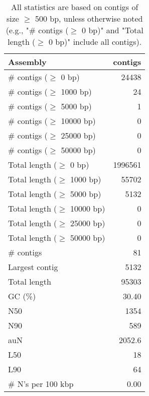 \documentclass[12pt,a4paper]{article}
\begin{document}
\begin{table}[ht]
\begin{center}
\caption{All statistics are based on contigs of size $\geq$ 500 bp, unless otherwise noted (e.g., "\# contigs ($\geq$ 0 bp)" and "Total length ($\geq$ 0 bp)" include all contigs).}
\begin{tabular}{|l*{1}{|r}|}
\hline
Assembly & contigs \\ \hline
\# contigs ($\geq$ 0 bp) & 24438 \\ \hline
\# contigs ($\geq$ 1000 bp) & 24 \\ \hline
\# contigs ($\geq$ 5000 bp) & 1 \\ \hline
\# contigs ($\geq$ 10000 bp) & 0 \\ \hline
\# contigs ($\geq$ 25000 bp) & 0 \\ \hline
\# contigs ($\geq$ 50000 bp) & 0 \\ \hline
Total length ($\geq$ 0 bp) & 1996561 \\ \hline
Total length ($\geq$ 1000 bp) & 55702 \\ \hline
Total length ($\geq$ 5000 bp) & 5132 \\ \hline
Total length ($\geq$ 10000 bp) & 0 \\ \hline
Total length ($\geq$ 25000 bp) & 0 \\ \hline
Total length ($\geq$ 50000 bp) & 0 \\ \hline
\# contigs & 81 \\ \hline
Largest contig & 5132 \\ \hline
Total length & 95303 \\ \hline
GC (\%) & 30.40 \\ \hline
N50 & 1354 \\ \hline
N90 & 589 \\ \hline
auN & 2052.6 \\ \hline
L50 & 18 \\ \hline
L90 & 64 \\ \hline
\# N's per 100 kbp & 0.00 \\ \hline
\end{tabular}
\end{center}
\end{table}
\end{document}
